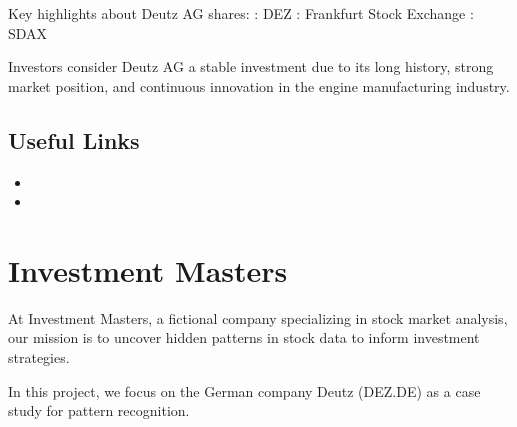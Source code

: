 \documentclass[letterpaper,10pt,english]{sphinxmanual}
\begin{document}
\sphinxAtStartPar
Key highlights about Deutz AG shares:
\sphinxhyphen{} : DEZ
\sphinxhyphen{} : Frankfurt Stock Exchange
\sphinxhyphen{} : SDAX

\sphinxAtStartPar
Investors consider Deutz AG a stable investment due to its long history, strong market position, and continuous innovation in the engine manufacturing industry.


\section{Useful Links}
\label{\detokenize{intro:useful-links}}\begin{itemize}
\item {} 
\sphinxAtStartPar
{}

\item {} 
\sphinxAtStartPar
{}

\end{itemize}

\sphinxstepscope


\chapter{Investment Masters}
\label{\detokenize{company:investment-masters}}\label{\detokenize{company::doc}}
\sphinxAtStartPar
At Investment Masters, a fictional company specializing in stock market analysis, our mission is to uncover hidden patterns in stock data to inform investment strategies.

\sphinxAtStartPar
In this project, we focus on the German company Deutz (DEZ.DE) as a case study for pattern recognition.
\end{document}
